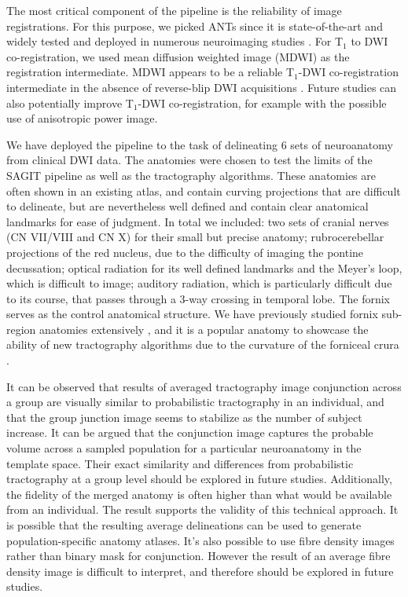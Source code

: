 The most critical component of the pipeline is the reliability of image registrations. For this purpose, we picked ANTs since it is state-of-the-art and widely tested and deployed in numerous neuroimaging studies \cite{Avants2011,Klein2009}. For T$_1$ to DWI co-registration, we used mean diffusion weighted image (MDWI) as the registration intermediate. MDWI appears to be a reliable T$_1$-DWI co-registration intermediate in the absence of reverse-blip DWI acquisitions \cite{Chen2015b}. Future studies can also potentially improve T$_1$-DWI co-registration, for example with the possible use of anisotropic power image\cite{DellAcqua2014}. 

We have deployed the pipeline to the task of delineating 6 sets of neuroanatomy from clinical DWI data. The anatomies were chosen to test the limits of the SAGIT pipeline as well as the tractography algorithms. These anatomies are often shown in an existing atlas, and contain curving projections that are difficult to delineate, but are nevertheless well defined and contain clear anatomical landmarks for ease of judgment. In total we included: two sets of cranial nerves (CN VII/VIII and CN X) for their small but precise anatomy; rubrocerebellar projections of the red nucleus, due to the difficulty of imaging the pontine decussation; optical radiation for its well defined landmarks and the Meyer's loop, which is difficult to image; auditory radiation, which is particularly difficult due to its course, that passes through a 3-way crossing in temporal lobe. The fornix serves as the control anatomical structure. We have previously studied fornix sub-region anatomies extensively \cite{Chen2015c}, and it is a popular anatomy to showcase the ability of new tractography algorithms due to the curvature of the forniceal crura \cite{Garyfallidis2014}. 

It can be observed that results of averaged tractography image conjunction across a group are visually similar to probabilistic tractography in an individual, and that the group junction image seems to stabilize as the number of subject increase. It can be argued that the conjunction image captures the probable volume across a sampled population for a particular neuroanatomy in the template space. Their exact similarity and differences from probabilistic tractography at a group level should be explored in future studies. Additionally, the fidelity of the merged anatomy is often higher than what would be available from an individual. The result supports the validity of this technical approach. It is possible that the resulting average delineations can be used to generate population-specific anatomy atlases. It's also possible to use fibre density images rather than binary mask for conjunction. However the result of an average fibre density image is difficult to interpret, and therefore should be explored in future studies.

